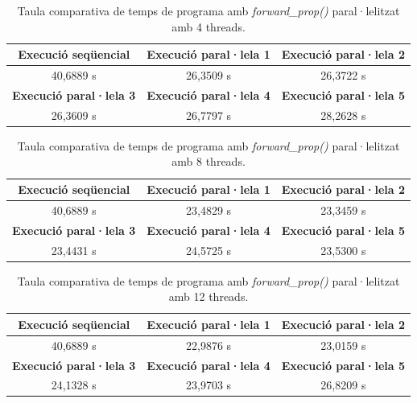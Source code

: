 \documentclass{article}
\begin{document}
\begin{table}[H]
    \centering
    \begin{tabular}{|c|c|c|}
        \hline
        \textbf{Execució seqüencial} & \textbf{Execució paral·lela 1} & \textbf{Execució paral·lela 2} \\ \hline
        40,6889 s & 26,3509 s & 26,3722 s\\ \hline
        \textbf{Execució paral·lela 3} & \textbf{Execució paral·lela 4} & \textbf{Execució paral·lela 5} \\ \hline
        26,3609 s & 26,7797 s & 28,2628 s \\ \hline
    \end{tabular}
    \caption{Taula comparativa de temps de programa amb \textit{forward\_prop()} paral·lelitzat amb 4 threads.}
    \label{tab:f3_4trheads}
\end{table}

\begin{table}[H]
    \centering
    \begin{tabular}{|c|c|c|}
        \hline
        \textbf{Execució seqüencial} & \textbf{Execució paral·lela 1} & \textbf{Execució paral·lela 2} \\ \hline
        40,6889 s & 23,4829 s & 23,3459 s \\ \hline
        \textbf{Execució paral·lela 3} & \textbf{Execució paral·lela 4} & \textbf{Execució paral·lela 5} \\ \hline
        23,4431 s & 24,5725 s & 23,5300 s \\ \hline
    \end{tabular}
    \caption{Taula comparativa de temps de programa amb \textit{forward\_prop()} paral·lelitzat amb 8 threads.}
    \label{tab:f3_8trheads}
\end{table}

\begin{table}[H]
    \centering
    \begin{tabular}{|c|c|c|}
        \hline
        \textbf{Execució seqüencial} & \textbf{Execució paral·lela 1} & \textbf{Execució paral·lela 2} \\ \hline
        40,6889 s & 22,9876 s & 23,0159 s \\ \hline
        \textbf{Execució paral·lela 3} & \textbf{Execució paral·lela 4} & \textbf{Execució paral·lela 5} \\ \hline
        24,1328 s & 23,9703 s & 26,8209 s\\ \hline
    \end{tabular}
    \caption{Taula comparativa de temps de programa amb \textit{forward\_prop()} paral·lelitzat amb 12 threads.}
    \label{tab:f3_12trheads}
\end{table}
\end{document}
